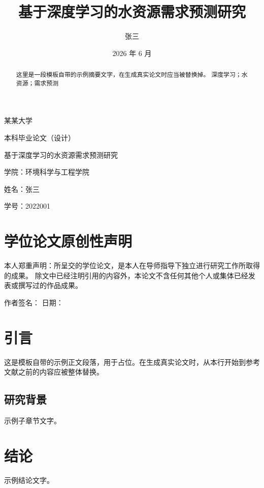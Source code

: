 \documentclass[12pt,a4paper]{ctexart}
\title{基于深度学习的水资源需求预测研究}
\author{张三}
\date{2026 年 6 月}
\newcommand{\keywords}[1]{%
  \vspace{1em}\noindent{\heiti 关键词：}#1%
}
\begin{document}
\begin{titlepage}
  \centering
  \vspace*{2.5cm}
  {\heiti 某某大学\par}
  \vspace{0.8cm}
  {\heiti 本科毕业论文（设计）\par}
  \vspace{2.5cm}
  {\heiti 基于深度学习的水资源需求预测研究\par}
  \vfill
  { 学院：环境科学与工程学院\par}
  \vspace{0.4cm}
  { 姓名：张三\par}
  \vspace{0.4cm}
  { 学号：2022001\par}
  \vspace{1.2cm}
\end{titlepage}
\newpage

\section*{学位论文原创性声明}
本人郑重声明：所呈交的学位论文，是本人在导师指导下独立进行研究工作所取得的成果。
除文中已经注明引用的内容外，本论文不含任何其他个人或集体已经发表或撰写过的作品成果。
\vspace{1.5cm}

\noindent 作者签名：\hspace{4cm} 日期：\hspace{3cm}
\newpage

\begin{abstract}
这里是一段模板自带的示例摘要文字，在生成真实论文时应当被替换掉。
\keywords{深度学习；水资源；需求预测}
\end{abstract}
\newpage

\tableofcontents
\newpage

\section{引言}

这是模板自带的示例正文段落，用于占位。在生成真实论文时，从本行开始到参考文献之前的内容应被整体替换。

\subsection{研究背景}

示例子章节文字。

\section{结论}

示例结论文字。




\end{document}

